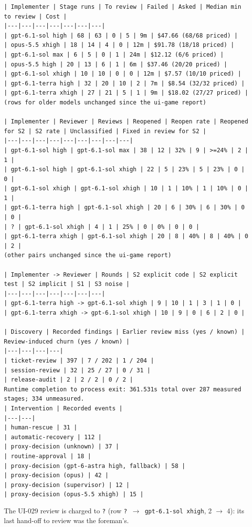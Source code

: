 \documentclass[11pt,a4paper]{article}
\begin{document}
{\tiny
\begin{verbatim}
| Implementer | Stage runs | To review | Failed | Asked | Median min to review | Cost |
|---|---|---|---|---|---|---|
| gpt-6.1-sol high | 68 | 63 | 0 | 5 | 9m | $47.66 (68/68 priced) |
| opus-5.5 xhigh | 18 | 14 | 4 | 0 | 12m | $91.78 (18/18 priced) |
| gpt-6.1-sol max | 6 | 5 | 0 | 1 | 24m | $12.12 (6/6 priced) |
| opus-5.5 high | 20 | 13 | 6 | 1 | 6m | $37.46 (20/20 priced) |
| gpt-6.1-sol xhigh | 10 | 10 | 0 | 0 | 12m | $7.57 (10/10 priced) |
| gpt-6.1-terra high | 32 | 20 | 10 | 2 | 7m | $8.54 (32/32 priced) |
| gpt-6.1-terra xhigh | 27 | 21 | 5 | 1 | 9m | $18.02 (27/27 priced) |
(rows for older models unchanged since the ui-game report)

| Implementer | Reviewer | Reviews | Reopened | Reopen rate | Reopened for S2 | S2 rate | Unclassified | Fixed in review for S2 |
|---|---|---|---|---|---|---|---|---|
| gpt-6.1-sol high | gpt-6.1-sol max | 38 | 12 | 32% | 9 | >=24% | 2 | 1 |
| gpt-6.1-sol high | gpt-6.1-sol xhigh | 22 | 5 | 23% | 5 | 23% | 0 | 0 |
| gpt-6.1-sol xhigh | gpt-6.1-sol xhigh | 10 | 1 | 10% | 1 | 10% | 0 | 1 |
| gpt-6.1-terra high | gpt-6.1-sol xhigh | 20 | 6 | 30% | 6 | 30% | 0 | 0 |
| ? | gpt-6.1-sol xhigh | 4 | 1 | 25% | 0 | 0% | 0 | 0 |
| gpt-6.1-terra xhigh | gpt-6.1-sol xhigh | 20 | 8 | 40% | 8 | 40% | 0 | 2 |
(other pairs unchanged since the ui-game report)

| Implementer -> Reviewer | Rounds | S2 explicit code | S2 explicit test | S2 implicit | S1 | S3 noise |
|---|---|---|---|---|---|---|
| gpt-6.1-terra high -> gpt-6.1-sol xhigh | 9 | 10 | 1 | 3 | 1 | 0 |
| gpt-6.1-terra xhigh -> gpt-6.1-sol xhigh | 10 | 9 | 0 | 6 | 2 | 0 |

| Discovery | Recorded findings | Earlier review miss (yes / known) | Review-induced churn (yes / known) |
|---|---|---|---|
| ticket-review | 397 | 7 / 202 | 1 / 204 |
| session-review | 32 | 25 / 27 | 0 / 31 |
| release-audit | 2 | 2 / 2 | 0 / 2 |
Runtime completion to process exit: 361.531s total over 287 measured stages; 334 unmeasured.
| Intervention | Recorded events |
|---|---|
| human-rescue | 31 |
| automatic-recovery | 112 |
| proxy-decision (unknown) | 37 |
| routine-approval | 18 |
| proxy-decision (gpt-6-astra high, fallback) | 58 |
| proxy-decision (opus) | 42 |
| proxy-decision (supervisor) | 12 |
| proxy-decision (opus-5.5 xhigh) | 15 |
\end{verbatim}
}

The UI-029 review is charged to \texttt{?} (row \texttt{? $\rightarrow$ gpt-6.1-sol xhigh}, 2
$\to$ 4): its last hand-off to review was the foreman's.
\end{document}
